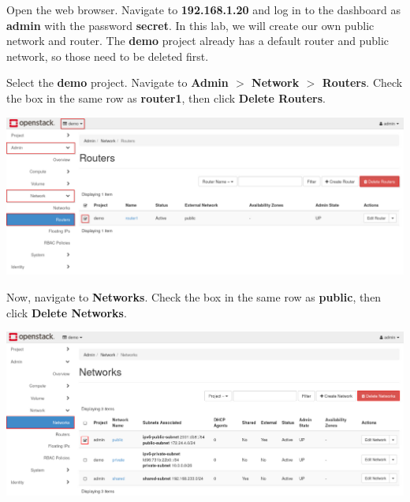 \documentclass[letterpaper, 12pt]{article}
\begin{document}
\begin{enumerate}
    \begin{labstep}
        Open the web browser.
        Navigate to \textbf{192.168.1.20} and log in to the dashboard as \textbf{admin} with the password \textbf{secret}.
        In this lab, we will create our own public network and router.
        The \textbf{demo} project already has a default router and public network, so those need to be deleted first.
    \end{labstep}

    \begin{labstep}
        Select the \textbf{demo} project.
        Navigate to \textbf{Admin $>$ Network $>$ Routers}.
        Check the box in the same row as \textbf{router1}, then click \textbf{Delete Routers}.

        \begin{center}
            \includegraphics[width=\linewidth]{images/part1/step4.png}
        \end{center}
    \end{labstep}

    \begin{labstep}
        Now, navigate to \textbf{Networks}.
        Check the box in the same row as \textbf{public}, then click
        \textbf{Delete Networks}.

        \begin{center}
            \includegraphics[width=\linewidth]{images/part1/step5.png}
        \end{center}
    \end{labstep}


\end{enumerate}
\end{document}
